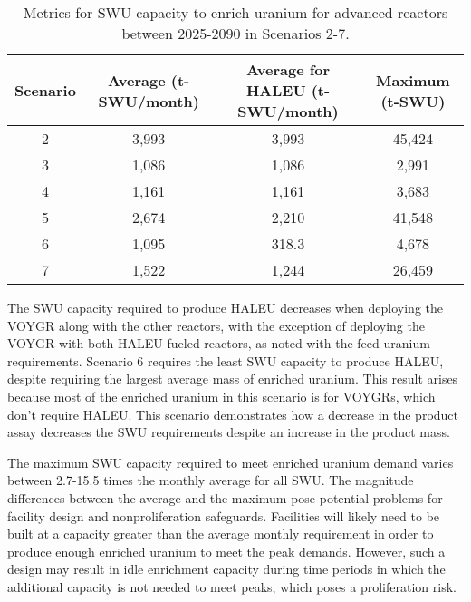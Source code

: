 \begin{table}
    \centering 
    \caption{Metrics for \gls{SWU} capacity to enrich uranium for 
    advanced reactors between 2025-2090 in Scenarios 2-7.}
    \label{tab:nogrowth_swu}
    \begin{tabular}{c c c c}
        \hline
        Scenario & Average  (t-SWU/month) & Average
        for \gls{HALEU} (t-SWU/month) & Maximum (t-SWU)\\\hline
        2 & 3,993 & 3,993 & 45,424 \\
        3 & 1,086 & 1,086 & 2,991\\
        4 & 1,161 & 1,161 & 3,683\\
        5 & 2,674 & 2,210 & 41,548 \\
        6 & 1,095 & 318.3 & 4,678\\
        7 & 1,522 & 1,244 & 26,459\\
        \hline
    \end{tabular}
\end{table}

The \gls{SWU} capacity required to produce \gls{HALEU} decreases when 
deploying the VOYGR along with the other reactors, with the exception 
of deploying the VOYGR with both \gls{HALEU}-fueled reactors, as noted 
with the feed uranium requirements. 
Scenario 6 requires the least \gls{SWU} capacity to produce 
\gls{HALEU}, despite requiring the largest average mass of enriched 
uranium. This result arises because most of the enriched uranium in this 
scenario is for VOYGRs, which don't require \gls{HALEU}. This 
scenario demonstrates how a decrease in the product assay decreases 
the \gls{SWU} requirements despite an increase in the product mass. 

The maximum \gls{SWU} capacity required to meet enriched uranium demand 
varies between 2.7-15.5 times the monthly average for all \gls{SWU}. 
The magnitude differences between the average and the maximum pose potential 
problems for facility design and nonproliferation safeguards. Facilities 
will likely need to be built at a capacity greater than the average 
monthly requirement in order to produce enough enriched uranium to meet 
the peak demands. However, such a design may result in idle enrichment 
capacity during time periods in which the additional capacity is 
not needed to meet peaks, which poses a proliferation risk. 

